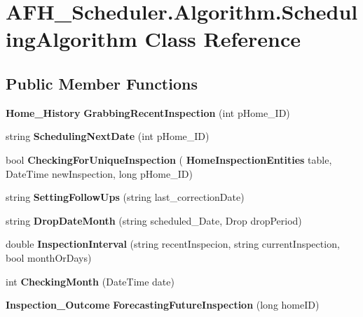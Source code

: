 \section{A\+F\+H\+\_\+\+Scheduler.\+Algorithm.\+Scheduling\+Algorithm Class Reference}
\label{class_a_f_h___scheduler_1_1_algorithm_1_1_scheduling_algorithm}
\subsection*{Public Member Functions}
\begin{DoxyCompactItemize}
\item 
\mbox{\label{class_a_f_h___scheduler_1_1_algorithm_1_1_scheduling_algorithm_a35a97d7813e8b62756642426d6d00f3c}} 
\textbf{ Home\+\_\+\+History} {\bfseries Grabbing\+Recent\+Inspection} (int p\+Home\+\_\+\+ID)
\item 
\mbox{\label{class_a_f_h___scheduler_1_1_algorithm_1_1_scheduling_algorithm_af1f6b5be3788638053a30757496ff021}} 
string {\bfseries Scheduling\+Next\+Date} (int p\+Home\+\_\+\+ID)
\item 
\mbox{\label{class_a_f_h___scheduler_1_1_algorithm_1_1_scheduling_algorithm_ad0c83caf1e34689117f8bfa5be119503}} 
bool {\bfseries Checking\+For\+Unique\+Inspection} (\textbf{ Home\+Inspection\+Entities} table, Date\+Time new\+Inspection, long p\+Home\+\_\+\+ID)
\item 
\mbox{\label{class_a_f_h___scheduler_1_1_algorithm_1_1_scheduling_algorithm_add0743684e331fae88d77057fe3fa786}} 
string {\bfseries Setting\+Follow\+Ups} (string last\+\_\+correction\+Date)
\item 
\mbox{\label{class_a_f_h___scheduler_1_1_algorithm_1_1_scheduling_algorithm_a6a229de0d36fff9bb422f7bcfedbff04}} 
string {\bfseries Drop\+Date\+Month} (string scheduled\+\_\+\+Date, Drop drop\+Period)
\item 
\mbox{\label{class_a_f_h___scheduler_1_1_algorithm_1_1_scheduling_algorithm_a08731157abc1d52ff09643386561ad9d}} 
double {\bfseries Inspection\+Interval} (string recent\+Inspecion, string current\+Inspection, bool month\+Or\+Days)
\item 
\mbox{\label{class_a_f_h___scheduler_1_1_algorithm_1_1_scheduling_algorithm_af536c7153f238a345d0b4d98523c815f}} 
int {\bfseries Checking\+Month} (Date\+Time date)
\item 
\mbox{\label{class_a_f_h___scheduler_1_1_algorithm_1_1_scheduling_algorithm_a0f7eff0f3e3a06c7fe363baf96337826}} 
\textbf{ Inspection\+\_\+\+Outcome} {\bfseries Forecasting\+Future\+Inspection} (long home\+ID)
\end{DoxyCompactItemize}
